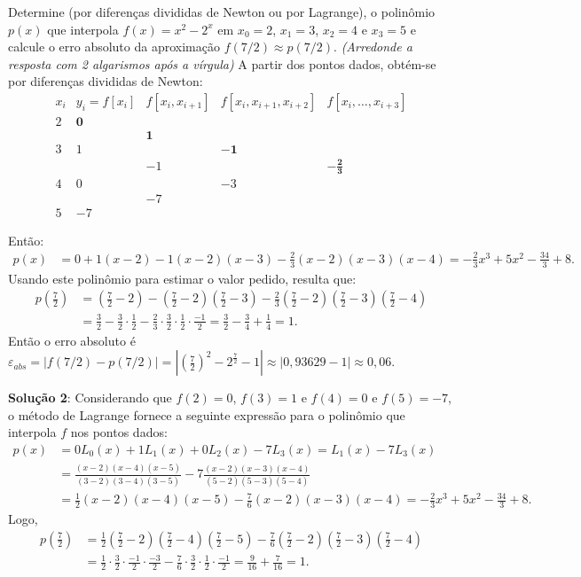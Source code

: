\documentclass[12pt,a4paper]{article}
\begin{document}
\begin{ExerciseList}
\Exercise[title={2,0}] Determine (por diferenças divididas de Newton ou por Lagrange), o polinômio $p(x)$ que interpola $f(x) = x^2 - 2^x$ em $x_0 = 2$, $x_1 = 3$, $x_2 = 4$ e $x_3 = 5$ e calcule o erro absoluto da aproximação $f(7/2) \approx p(7/2)$.
{\color{blue} \textit{(Arredonde a resposta com 2 algarismos após a vírgula)}}
\Answer A partir dos pontos dados, obtém-se por diferenças divididas de Newton:
\[
\begin{array}{cccccc}
x_i
& y_i=f[x_i]
& f[x_i,x_{i+1}]
& f[x_i,x_{i+1},x_{i+2}]
& f[x_i,\ldots,x_{i+3}]\\
2 & \mathbf{0} \\
  & & \mathbf{1} \\
3 & 1 & & \mathbf{-1} \\
  & & -1 & & \mathbf{-\frac{2}{3}} \\
4 & 0 & & -3\\
  & & -7 \\
5 & -7
\end{array}
\]

Então:
\begin{align*}
p(x)
&=0
 +1 (x-2)
 -1 (x-2)(x-3)
 -\frac{2}{3} (x-2)(x-3)(x-4)
  = -\frac{2}{3}x^3 + 5x^2 - \frac{34}{3} + 8.
\end{align*}
Usando este polinômio para estimar o valor pedido, resulta que:
\begin{align*}
  p\left(\frac{7}{2}\right)
  & =\left(\frac{7}{2}-2\right)
  -\left(\frac{7}{2}-2\right)\left(\frac{7}{2}-3\right)
  -\frac{2}{3} \left(\frac{7}{2}-2\right)\left(\frac{7}{2}-3\right)\left(\frac{7}{2}-4\right) \\
  & =\frac{3}{2}
  -\frac{3}{2} \cdot \frac{1}{2}
  -\frac{2}{3} \cdot \frac{3}{2}\cdot \frac{1}{2}\cdot \frac{-1}{2}
  =\frac{3}{2}
  -\frac{3}{4}
  +\frac{1}{4}
  = 1.
\end{align*}
Então o erro absoluto é $\varepsilon_{abs} = |f(7/2) - p(7/2)| = \left|\left(\frac{7}{2}\right)^2 - 2^{\frac{7}{2}} - 1 \right| \approx |0,93629 - 1| \approx 0,06$.

\textbf{Solução 2}: Considerando que $f(2) = 0$, $f(3) = 1$ e $f(4) = 0$ e $f(5)=-7$, o método de Lagrange fornece a seguinte expressão para o polinômio que interpola $f$ nos pontos dados:
\begin{align*}
p(x)
  & = 0 L_0(x) + 1 L_1(x) + 0 L_2(x) - 7 L_3(x)
    = L_1(x) - 7 L_3(x) \\
  & = \frac{(x-2)(x-4)(x-5)}{(3-2)(3-4)(3-5)}
  -7 \frac{(x-2)(x-3)(x-4)}{(5-2)(5-3)(5-4)}\\
  & = \frac{1}{2}(x-2)(x-4)(x-5)
   -\frac{7}{6}(x-2)(x-3)(x-4)
    = -\frac{2}{3}x^3 + 5x^2 - \frac{34}{3} + 8.
\end{align*}
Logo,
\begin{align*}
  p\left(\frac{7}{2}\right)
  & = \frac{1}{2}\left(\frac{7}{2}-2\right)\left(\frac{7}{2}-4\right)\left(\frac{7}{2}-5\right)
    - \frac{7}{6}\left(\frac{7}{2}-2\right)\left(\frac{7}{2}-3\right)\left(\frac{7}{2}-4\right) \\
  & = \frac{1}{2}\cdot\frac{3}{2}\cdot\frac{-1}{2}\cdot\frac{-3}{2}
    - \frac{7}{6}\cdot\frac{3}{2}\cdot\frac{1}{2}\cdot\frac{-1}{2}
    = \frac{9}{16} + \frac{7}{16}
    = 1.
\end{align*}


\end{ExerciseList}
\end{document}
